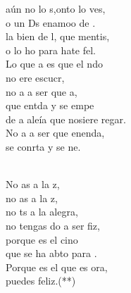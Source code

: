 \documentclass[12pt]{article}
\begin{document}
\begin{multicols*}{2}
\begin{cancion}%
	aún no lo s,onto lo ves, \\
	o un Ds enamoo de .\\
	la bien de l, que mentis, \\
	o lo ho para hate fel.\\
	Lo que a es que el ndo\\
	no ere escucr,\\
	no a a ser que a,\\
	que entda y se empe\\
	de a aleía que nosiere regar.\\
	No a a ser que enenda,\\
	se conrta y se ne.\\\jump\\
	\begin{chorus}%
	No as a la z,\\
	no as a la z,\\
	no ts a la alegra,\\
	no tengas do a ser fiz,\\
	porque  es el cino\\
	que se ha abto para .\\
	Porque  es el que es ora,\\
	puedes  feliz.(**)\\
	\end{chorus}%
	\jump\\
\end{cancion}%


\end{multicols*}
\end{document}
